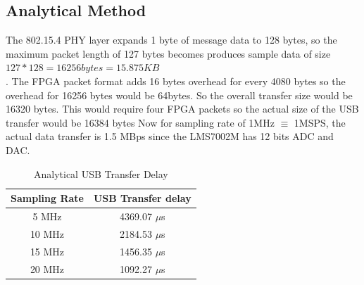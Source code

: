 \documentclass{kththesis}
\begin{document}
\subsection{Analytical Method}
The 802.15.4 PHY layer expands 1 byte of message data to 128 bytes, so the maximum packet length of 127 bytes becomes produces sample data of size
$127*128=16256 bytes=15.875KB$\\. The FPGA packet format adds 16 bytes overhead for every 4080 bytes so the overhead for 16256 bytes would be 64bytes. So the overall transfer size would be 16320 bytes. This would require four FPGA packets so the actual size of the USB transfer would be 16384 bytes
Now for sampling rate of 1MHz $\equiv$ 1MSPS, the actual data transfer is 1.5 MBps since the LMS7002M has 12 bits ADC and DAC. 
\begin{table}[!h]
\centering
\begin{tabular}{|c|c|}
\hline
Sampling Rate & USB Transfer delay \\
\hline
5 MHz & 4369.07 $\mu$s\\
10 MHz & 2184.53 $\mu$s\\
15 MHz & 1456.35 $\mu$s\\
20 MHz & 1092.27 $\mu$s\\
\hline
\end{tabular}
\caption{Analytical USB Transfer Delay}
\label{back_env}
\end{table}
\end{document}
